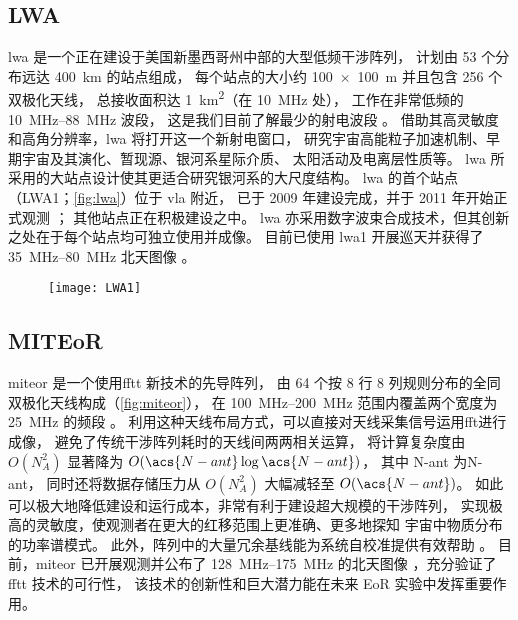 \subsection{LWA}

\acf{lwa} 是一个正在建设于美国新墨西哥州中部的大型低频干涉阵列，
计划由 53 个分布远达 \SI{400}{\km} 的站点组成，
每个站点的大小约 \SI{100x100}{\meter} 并且包含 256 个双极化天线，
总接收面积达 \SI{1}{\km\squared}（在 \SI{10}{\MHz} 处），
工作在非常低频的 \SIrange{10}{88}{\MHz} 波段，
这是我们目前了解最少的射电波段 \cite{ellingson2009}。
借助其高灵敏度和高角分辨率，\acs{lwa} 将打开这一个新射电窗口，
研究宇宙高能粒子加速机制、早期宇宙及其演化、暂现源、银河系星际介质、
太阳活动及电离层性质等。
\acs{lwa} 所采用的大站点设计使其更适合研究银河系的大尺度结构。
\acs{lwa} 的首个站点（LWA1；\autoref{fig:lwa}）位于 \ac{vla} 附近，
已于 2009 年建设完成，并于 2011 年开始正式观测 \cite{taylor2012,ellingson2013}；
其他站点正在积极建设之中。
\acs{lwa} 亦采用数字波束合成技术，但其创新之处在于每个站点均可独立使用并成像。
目前已使用 \acs{lwa}1 开展巡天并获得了 \SIrange{35}{80}{\MHz}
北天图像 \cite{dowell2017}。

\begin{figure}[!htb]
  \centering
  \texttt{[image: LWA1]}
  \label{fig:lwa}
\end{figure}

\subsection{MITEoR}

\acf{miteor} 是一个使用\ac{fftt} 新技术\cite{tegmark2009}的先导阵列，
由 64 个按 8 行 8 列规则分布的全同双极化天线构成（\autoref{fig:miteor}），
在 \SIrange{100}{200}{\MHz} 范围内覆盖两个宽度为 \SI{25}{\MHz} 的频段
\cite{zheng2014}。
利用这种天线布局方式，可以直接对天线采集信号运用\ac{fft}进行成像，
避免了传统干涉阵列耗时的天线间两两相关运算，
将计算复杂度由 $O(N_{\!A}^2)$ 显著降为 $O(\acs{N-ant} \log\acs{N-ant})$，
其中 \acs{N-ant} 为\acl{N-ant}，
同时还将数据存储压力从 $O(N_{\!A}^2)$ 大幅减轻至 $O(\acs{N-ant})$。
如此可以极大地降低建设和运行成本，非常有利于建设超大规模的干涉阵列，
实现极高的灵敏度，使观测者在更大的红移范围上更准确、更多地探知
宇宙中物质分布的功率谱模式。
此外，阵列中的大量冗余基线能为系统自校准提供有效帮助 \cite{dillon2016}。
目前，\acs{miteor} 已开展观测并公布了 \SIrange{128}{175}{\MHz} 的北天图像
\cite{zheng2017}，充分验证了 \acs{fftt} 技术的可行性，
该技术的创新性和巨大潜力能在未来 EoR 实验中发挥重要作用。

